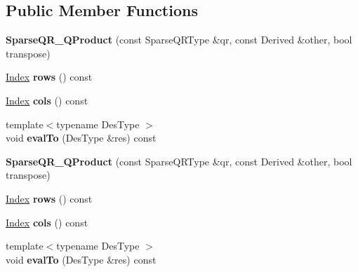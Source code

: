 \subsection*{Public Member Functions}
\begin{DoxyCompactItemize}
\item 
\mbox{\label{struct_eigen_1_1_sparse_q_r___q_product_a93450cb8c73ae375832fb21ea99055b6}} 
{\bfseries Sparse\+Q\+R\+\_\+\+Q\+Product} (const Sparse\+Q\+R\+Type \&qr, const Derived \&other, bool transpose)
\item 
\mbox{\label{struct_eigen_1_1_sparse_q_r___q_product_aff4a9c22b6a9f018ee5182aabfb6cd06}} 
\hyperlink{namespace_eigen_a62e77e0933482dafde8fe197d9a2cfde}{Index} {\bfseries rows} () const
\item 
\mbox{\label{struct_eigen_1_1_sparse_q_r___q_product_a040e2e2de371b4abdabaf28511f3bfa2}} 
\hyperlink{namespace_eigen_a62e77e0933482dafde8fe197d9a2cfde}{Index} {\bfseries cols} () const
\item 
\mbox{\label{struct_eigen_1_1_sparse_q_r___q_product_a320229d32cb114e0b3664aa7f4647930}} 
{\footnotesize template$<$typename Des\+Type $>$ }\\void {\bfseries eval\+To} (Des\+Type \&res) const
\item 
\mbox{\label{struct_eigen_1_1_sparse_q_r___q_product_a93450cb8c73ae375832fb21ea99055b6}} 
{\bfseries Sparse\+Q\+R\+\_\+\+Q\+Product} (const Sparse\+Q\+R\+Type \&qr, const Derived \&other, bool transpose)
\item 
\mbox{\label{struct_eigen_1_1_sparse_q_r___q_product_aff4a9c22b6a9f018ee5182aabfb6cd06}} 
\hyperlink{namespace_eigen_a62e77e0933482dafde8fe197d9a2cfde}{Index} {\bfseries rows} () const
\item 
\mbox{\label{struct_eigen_1_1_sparse_q_r___q_product_a040e2e2de371b4abdabaf28511f3bfa2}} 
\hyperlink{namespace_eigen_a62e77e0933482dafde8fe197d9a2cfde}{Index} {\bfseries cols} () const
\item 
\mbox{\label{struct_eigen_1_1_sparse_q_r___q_product_a320229d32cb114e0b3664aa7f4647930}} 
{\footnotesize template$<$typename Des\+Type $>$ }\\void {\bfseries eval\+To} (Des\+Type \&res) const
\end{DoxyCompactItemize}
